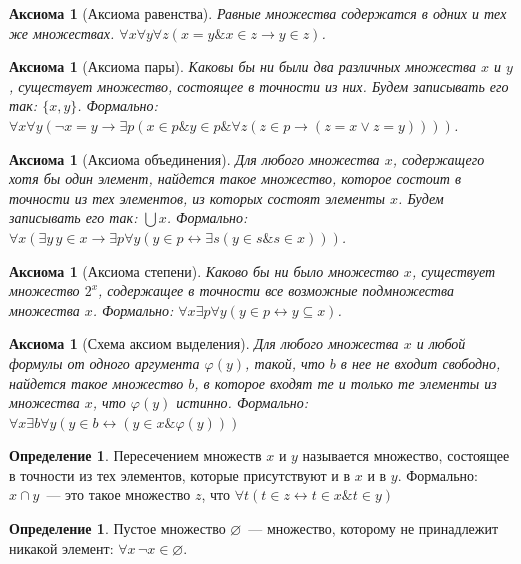 \documentclass[a4paper,11pt]{article}
\newtheorem{axm}[thm]{Аксиома}
\theoremstyle{definition}
\newtheorem{dfn}[thm]{Определение}
\newcommand{\amp}{\mathbin{\&}}
\begin{document}
\begin{axm}[Аксиома равенства]
Равные множества содержатся в одних и тех же множествах. $\forall x\forall
y\forall z(x = y \amp x \in z \to y \in z)$.
\end{axm}

\begin{axm}[Аксиома пары]
Каковы бы ни были два различных множества $x$ и $y$, существует множество,
состоящее в точности из них. Будем записывать его так: $\{x, y\}$. Формально:
$\forall x\forall y(\neg x = y \to \exists p(x \in p \amp y \in p \amp \forall
z(z \in p \to (z = x \vee z = y))))$.
\end{axm}

\begin{axm}[Аксиома объединения]
Для любого множества $x$, содержащего хотя бы один элемент, найдется такое
множество, которое состоит в точности из тех элементов, из которых состоят
элементы $x$. Будем записывать его так: $\bigcup x$. Формально: $\forall
x(\exists y\, y \in x \to \exists p\forall y(y \in p \leftrightarrow \exists
s(y \in s \amp s \in x)))$.
\end{axm}

\begin{axm}[Аксиома степени]
Каково бы ни было множество $x$, существует множество $2^x$, содержащее в
точности все возможные подмножества множества $x$. Формально: $\forall
x\exists p\forall y(y \in p \leftrightarrow y \subseteq x)$.
\end{axm}

\begin{axm}[Схема аксиом выделения]
Для любого множества $x$ и любой формулы от одного аргумента $\varphi(y)$,
такой, что $b$ в нее не входит свободно, найдется такое множество $b$, в
которое входят те и только те элементы из множества $x$, что $\varphi(y)$
истинно. Формально: $\forall x\exists b\forall y(y \in b \leftrightarrow (y \in
x \amp \varphi(y)))$
\end{axm}

\begin{dfn}
Пересечением множеств $x$ и $y$ называется множество, состоящее в точности из
тех элементов, которые присутствуют и в $x$ и в $y$. Формально: $x \cap y$~---
это такое множество $z$, что $\forall t(t \in z \leftrightarrow t \in x \amp t
\in y)$
\end{dfn}

\begin{dfn}
Пустое множество $\varnothing$~--- множество, которому не принадлежит никакой
элемент: $\forall x\,\neg x \in \varnothing$.
\end{dfn}
\end{document}
